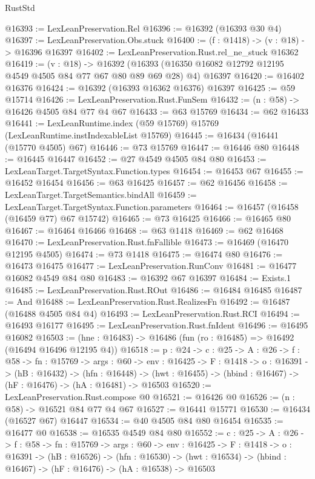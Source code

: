 \begin{lexlean}{RustStd}
\begin{coremodule}
@16393 := LexLeanPreservation.Rel
@16396 := @16392 (@16393 @30 @4)
@16397 := LexLeanPreservation.Obs.stuck
@16400 := (f : @1418) -> (v : @18) -> @16396 @16397
@16402 := LexLeanPreservation.Rust.rel_ne_stuck @16362
@16419 := (v : @18) ->
  @16392 (@16393 (@16350 @16082 @12792 @12195 @4549 @4505 @84 @77 @67 @80 @89 @69 @28) @4) @16397
@16420 := @16402 @16376
@16424 := @16392 (@16393 @16362 @16376) @16397
@16425 := @59 @15714
@16426 := LexLeanPreservation.Rust.FunSem
@16432 := (n : @58) -> @16426 @4505 @84 @77 @4 @67
@16433 := @63 @15769
@16434 := @62 @16433
@16441 := LexLeanRuntime.index (@59 @15769) @15769 (LexLeanRuntime.instIndexableList @15769)
@16445 := @16434 (@16441 (@15770 @4505) @67)
@16446 := @73 @15769
@16447 := @16446 @80
@16448 := @16445 @16447
@16452 := @27 @4549 @4505 @84 @80
@16453 := LexLeanTarget.TargetSyntax.Function.types
@16454 := @16453 @67
@16455 := @16452 @16454
@16456 := @63 @16425
@16457 := @62 @16456
@16458 := LexLeanTarget.TargetSemantics.bindAll
@16459 := LexLeanTarget.TargetSyntax.Function.parameters
@16464 := @16457 (@16458 (@16459 @77) @67 @15742)
@16465 := @73 @16425
@16466 := @16465 @80
@16467 := @16464 @16466
@16468 := @63 @1418
@16469 := @62 @16468
@16470 := LexLeanPreservation.Rust.fnFallible
@16473 := @16469 (@16470 @12195 @4505)
@16474 := @73 @1418
@16475 := @16474 @80
@16476 := @16473 @16475
@16477 := LexLeanPreservation.RunConv
@16481 := @16477 @16082 @4549 @84 @80
@16483 := @16392 @67 @16397
@16484 := Exists.{1}
@16485 := LexLeanPreservation.Rust.ROut
@16486 := @16484 @16485
@16487 := And
@16488 := LexLeanPreservation.Rust.RealizesFn
@16492 := @16487 (@16488 @4505 @84 @4)
@16493 := LexLeanPreservation.Rust.RCI
@16494 := @16493 @16177
@16495 := LexLeanPreservation.Rust.fnIdent
@16496 := @16495 @16082
@16503 := (hne : @16483) -> @16486 (fun (ro : @16485) => @16492 (@16494 @16496 @12195 @4))
@16518 := {p : @24} ->
  {c : @25} ->
  {A : @26} ->
  {f : @58} ->
  {fn : @15769} ->
  {args : @60} ->
  {env : @16425} ->
  {F : @1418} ->
  {o : @16391} ->
  (hB : @16432) ->
  (hfn : @16448) -> (hwt : @16455) -> (hbind : @16467) -> (hF : @16476) -> (hA : @16481) -> @16503
@16520 := LexLeanPreservation.Rust.compose @0
@16521 := @16426 @0
@16526 := (n : @58) -> @16521 @84 @77 @4 @67
@16527 := @16441 @15771
@16530 := @16434 (@16527 @67) @16447
@16534 := @40 @4505 @84 @80 @16454
@16535 := @16477 @0
@16538 := @16535 @4549 @84 @80
@16552 := {c : @25} ->
  {A : @26} ->
  {f : @58} ->
  {fn : @15769} ->
  {args : @60} ->
  {env : @16425} ->
  {F : @1418} ->
  {o : @16391} ->
  (hB : @16526) ->
  (hfn : @16530) -> (hwt : @16534) -> (hbind : @16467) -> (hF : @16476) -> (hA : @16538) -> @16503

\end{coremodule}
\end{lexlean}
